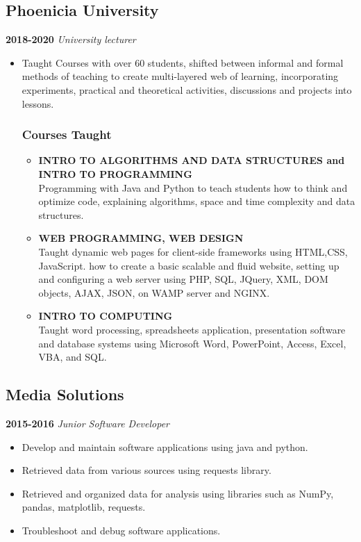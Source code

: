 \documentclass{article}
\begin{document}
\subsection{Phoenicia University}
    \textbf{2018-2020}
    \textit{University lecturer}
    \begin{itemize}
	    \item Taught Courses with over 60 students, shifted between informal and formal methods of teaching to create multi-layered web of learning, incorporating experiments, practical and theoretical activities, discussions and projects into lessons.
    		\subsubsection{Courses Taught}
	    \begin{itemize}
		    \item \textbf{INTRO TO ALGORITHMS AND DATA STRUCTURES and INTRO TO PROGRAMMING}\\Programming with Java and Python to teach students how to think and optimize code, explaining algorithms, space and time complexity and data structures.
		    \item \textbf{WEB PROGRAMMING, WEB DESIGN}\\Taught dynamic web pages for client-side frameworks using HTML,CSS, JavaScript. how to create a basic scalable and fluid website, setting up and configuring a web server using PHP, SQL, JQuery, XML, DOM objects, AJAX, JSON, on WAMP server and NGINX.
		    \item \textbf{INTRO TO COMPUTING}\\Taught word processing, spreadsheets application, presentation software and database systems using Microsoft Word, PowerPoint, Access, Excel, VBA, and SQL.
    \end{itemize}
    \end{itemize}
    
\subsection{Media Solutions}
    \textbf{2015-2016}
    \textit{Junior Software Developer}
    \begin{itemize}
	    \item Develop and maintain software applications using java and python.
	    \item Retrieved data from various sources using requests library.
	    \item Retrieved and organized data for analysis using libraries such as NumPy, pandas, matplotlib, requests.
	    \item Troubleshoot and debug software applications.
    \end{itemize}
  
\end{document}

